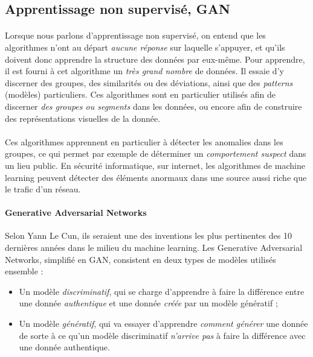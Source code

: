 \subsection*{Apprentissage non supervisé, GAN}

\paragraph{} Lorsque nous parlons d'apprentissage non supervisé, on entend que les algorithmes n'ont au départ \emph{aucune
réponse} sur laquelle s'appuyer, et qu'ils doivent donc apprendre la structure des données par eux-même. Pour apprendre, il
est fourni à cet algorithme un \emph{très grand nombre} de données. Il essaie d'y discerner des groupes, des similarités ou
des déviations, ainsi que des \emph{patterns} (modèles) particuliers. Ces algorithmes sont en particulier utilisés afin de
discerner \emph{des groupes ou segments} dans les données, ou encore afin de construire des représentations visuelles de la
donnée.


\paragraph{} Ces algorithmes apprennent en particulier à détecter les anomalies dans les groupes, ce qui permet par 
exemple de déterminer un \emph{comportement suspect} dans un lieu public. En sécurité informatique, sur internet, 
les algorithmes de machine learning peuvent détecter des éléments anormaux dans une source aussi riche que le trafic
d'un réseau. 

\paragraph{Generative Adversarial Networks} Selon Yann Le Cun, ils seraient une des inventions les plus pertinentes
des 10 dernières années dans le milieu du machine learning. Les Generative Adversarial Networks, simplifié en GAN,
consistent en deux types de modèles utilisés ensemble :

\begin{itemize}
    \item Un modèle \emph{discriminatif}, qui se charge d'apprendre à faire la différence entre une donnée \emph{authentique}
    et une donnée \emph{créée} par un modèle génératif ;
    \item Un modèle \emph{génératif}, qui va essayer d'apprendre \emph{comment générer} une donnée de sorte à ce 
    qu'un modèle discriminatif \emph{n'arrive pas} à faire la différence avec une donnée authentique.
\end{itemize} 


